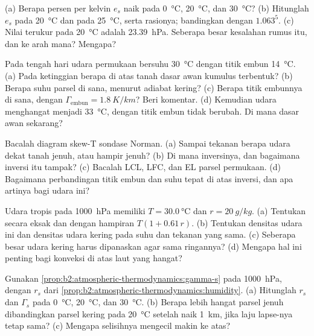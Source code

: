 \begin{exercise}[$\star$]\label{exo:b2:atmospheric-thermodynamics:2}
(a) Berapa persen per kelvin $e_s$ naik pada \qty{0}{\celsius}, \qty{20}{\celsius}, dan
\qty{30}{\celsius}? (b) Hitunglah $e_s$ pada \qty{20}{\celsius} dan pada \qty{25}{\celsius}, serta
rasionya; bandingkan dengan $1.063^5$. (c) Nilai terukur pada \qty{20}{\celsius} adalah
\qty{23.39}{hPa}. Seberapa besar kesalahan rumus itu, dan ke arah mana? Mengapa?
\end{exercise}

\begin{exercise}[$\star$]\label{exo:b2:atmospheric-thermodynamics:3}
Pada tengah hari udara permukaan bersuhu \qty{30}{\celsius} dengan titik embun \qty{14}{\celsius}. (a) Pada
ketinggian berapa di atas tanah dasar awan kumulus terbentuk? (b) Berapa suhu parsel
di sana, menurut adiabat kering? (c) Berapa titik embunnya di sana, dengan $\Gamma_{\text{embun}} =
\qty{1.8}{K/km}$? Beri komentar. (d) Kemudian udara menghangat menjadi \qty{33}{\celsius}, dengan titik embun
tidak berubah. Di mana dasar awan sekarang?
\end{exercise}

\begin{exercise}[$\star$]\label{exo:b2:atmospheric-thermodynamics:4}
Bacalah diagram skew-T sondase Norman. (a) Sampai tekanan berapa udara dekat
tanah jenuh, atau hampir jenuh? (b) Di mana inversinya, dan bagaimana inversi itu tampak? (c) Bacalah
LCL, LFC, dan EL parsel permukaan. (d) Bagaimana perbandingan titik embun dan suhu
tepat di atas inversi, dan apa artinya bagi udara ini?
\end{exercise}

\begin{exercise}[$\star\star$]\label{exo:b2:atmospheric-thermodynamics:5}
Udara tropis pada \qty{1000}{hPa} memiliki $T = \qty{30.0}{\celsius}$ dan $r = \qty{20}{g/kg}$. (a) Tentukan
 secara eksak dan dengan hampiran $T(1 + 0.61\,r)$. (b) Tentukan densitas
udara ini dan densitas udara kering pada suhu dan tekanan yang sama. (c) Seberapa besar udara kering
harus dipanaskan agar sama ringannya? (d) Mengapa hal ini penting bagi konveksi di atas laut yang hangat?
\end{exercise}

\begin{exercise}[$\star\star$]\label{exo:b2:atmospheric-thermodynamics:6}
Gunakan \cref{prop:b2:atmospheric-thermodynamics:gamma-s} pada \qty{1000}{hPa}, dengan $r_s$ dari
\cref{prop:b2:atmospheric-thermodynamics:humidity}. (a) Hitunglah $r_s$ dan $\Gamma_s$ pada
\qty{0}{\celsius}, \qty{20}{\celsius}, dan \qty{30}{\celsius}. (b) Berapa lebih hangat parsel jenuh
dibandingkan parsel kering pada \qty{20}{\celsius} setelah naik \qty{1}{km}, jika laju lapse-nya
tetap sama? (c) Mengapa selisihnya mengecil makin ke atas?
\end{exercise}

